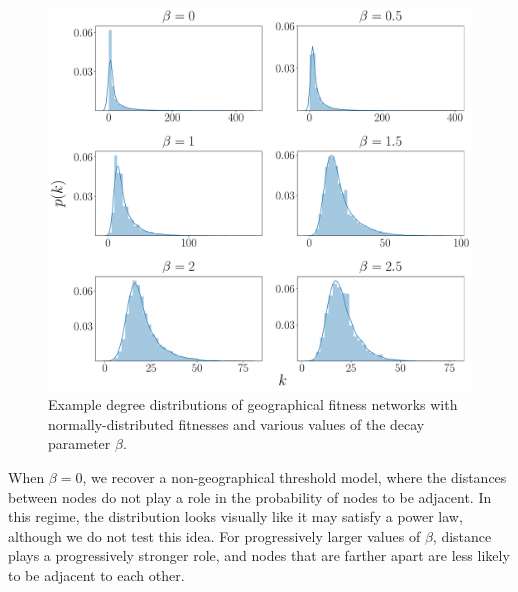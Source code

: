 \documentclass[%
 reprint,
 amsmath,amssymb,
 aps,
]{revtex4-1}
\begin{document}
\begin{figure}
    \centering
    \includegraphics[width=0.7\linewidth]{geographical_degree_distribution3.pdf}
    \caption{Example degree distributions of geographical fitness networks with normally-distributed fitnesses and various values of the decay parameter $\beta$.
    }
\end{figure}


When $\beta = 0$, we recover a non-geographical threshold model, where the distances between nodes do not play a role in the probability of nodes to be adjacent. In this regime, the distribution looks visually like it may satisfy a power law, although we do not test this idea.
 For progressively larger values of $\beta$, distance plays a progressively stronger role, and nodes that are farther apart are less likely to be adjacent to each other.
\end{document}
